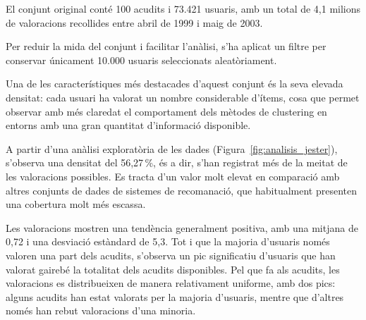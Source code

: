 \documentclass[a4paper,12pt]{report}
\begin{document}
El conjunt original conté 100 acudits i 73.421 usuaris, amb un total de 4,1 milions de valoracions recollides entre abril de 1999 i maig de 2003.

Per reduir la mida del conjunt i facilitar l’anàlisi, s’ha aplicat un filtre per conservar únicament 10.000 usuaris seleccionats aleatòriament.

Una de les característiques més destacades d’aquest conjunt és la seva elevada densitat: cada usuari ha valorat un nombre considerable d’ítems, cosa que permet observar amb més claredat el comportament dels mètodes de clustering en entorns amb una gran quantitat d’informació disponible.

A partir d’una anàlisi exploratòria de les dades (Figura~\ref{fig:analisis_jester}), s’observa una densitat del 56,27\,\%, és a dir, s’han registrat més de la meitat de les valoracions possibles. Es tracta d’un valor molt elevat en comparació amb altres conjunts de dades de sistemes de recomanació, que habitualment presenten una cobertura molt més escassa.

Les valoracions mostren una tendència generalment positiva, amb una mitjana de 0,72 i una desviació estàndard de 5,3. Tot i que la majoria d’usuaris només valoren una part dels acudits, s’observa un pic significatiu d’usuaris que han valorat gairebé la totalitat dels acudits disponibles. Pel que fa als acudits, les valoracions es distribueixen de manera relativament uniforme, amb dos pics: alguns acudits han estat valorats per la majoria d’usuaris, mentre que d’altres només han rebut valoracions d’una minoria.
\end{document}
